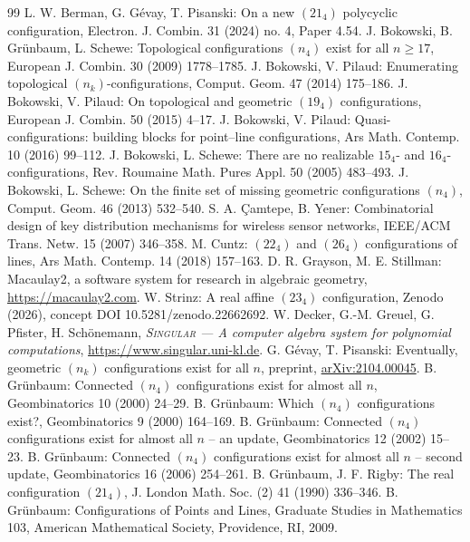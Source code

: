 \documentclass[11pt]{article}
\theoremstyle{plain}
\theoremstyle{definition}
\begin{document}
\newpage
\begin{thebibliography}{99}
 L. W. Berman, G. G\'evay, T. Pisanski: On a new $(21_4)$ polycyclic configuration, Electron. J. Combin. 31 (2024) no. 4, Paper 4.54.
 J. Bokowski, B. Gr\"unbaum, L. Schewe: Topological configurations $(n_4)$ exist for all $n\ge 17$, European J. Combin. 30 (2009) 1778--1785.
 J. Bokowski, V. Pilaud: Enumerating topological $(n_k)$-configurations, Comput. Geom. 47 (2014) 175--186.
 J. Bokowski, V. Pilaud: On topological and geometric $(19_4)$ configurations, European J. Combin. 50 (2015) 4--17.
 J. Bokowski, V. Pilaud: Quasi-configurations: building blocks for point--line configurations, Ars Math. Contemp. 10 (2016) 99--112.
 J. Bokowski, L. Schewe: There are no realizable $15_4$- and $16_4$-configurations, Rev. Roumaine Math. Pures Appl. 50 (2005) 483--493.
 J. Bokowski, L. Schewe: On the finite set of missing geometric configurations $(n_4)$, Comput. Geom. 46 (2013) 532--540.
 S. A. \c{C}amtepe, B. Yener: Combinatorial design of key distribution mechanisms for wireless sensor networks, IEEE/ACM Trans. Netw. 15 (2007) 346--358.
 M. Cuntz: $(22_4)$ and $(26_4)$ configurations of lines, Ars Math. Contemp. 14 (2018) 157--163.
 D. R. Grayson, M. E. Stillman: Macaulay2, a software system for research in algebraic geometry, \url{https://macaulay2.com}.
 W. Strinz: A real affine $(23_4)$ configuration, Zenodo (2026), concept DOI 10.5281/zenodo.22662692.
 W. Decker, G.-M. Greuel, G. Pfister, H. Sch\"onemann, \emph{\textsc{Singular} --- A computer algebra system for polynomial computations}, \url{https://www.singular.uni-kl.de}.
 G. G\'evay, T. Pisanski: Eventually, geometric $(n_k)$ configurations exist for all $n$, preprint, \href{https://arxiv.org/abs/2104.00045}{arXiv:2104.00045}.
 B. Gr\"unbaum: Connected $(n_4)$ configurations exist for almost all $n$, Geombinatorics 10 (2000) 24--29.
 B. Gr\"unbaum: Which $(n_4)$ configurations exist?, Geombinatorics 9 (2000) 164--169.
 B. Gr\"unbaum: Connected $(n_4)$ configurations exist for almost all $n$ -- an update, Geombinatorics 12 (2002) 15--23.
 B. Gr\"unbaum: Connected $(n_4)$ configurations exist for almost all $n$ -- second update, Geombinatorics 16 (2006) 254--261.
 B. Gr\"unbaum, J. F. Rigby: The real configuration $(21_4)$, J. London Math. Soc. (2) 41 (1990) 336--346.
 B. Gr\"unbaum: Configurations of Points and Lines, Graduate Studies in Mathematics 103, American Mathematical Society, Providence, RI, 2009.

\end{thebibliography}
\end{document}
